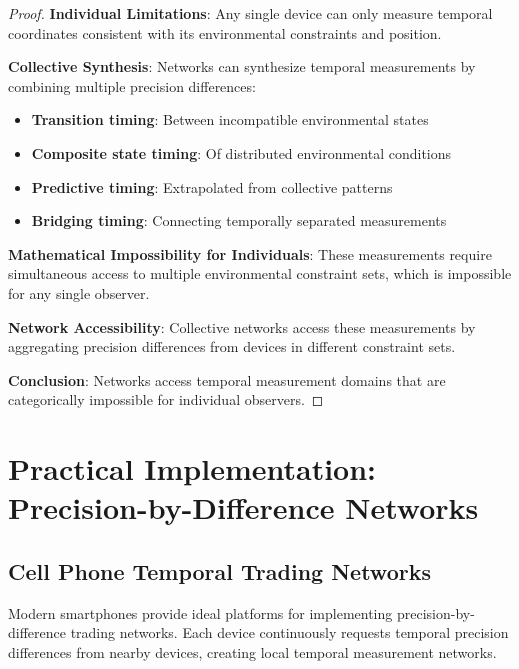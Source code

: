 \documentclass[12pt,a4paper]{article}
\begin{document}
\begin{proof}
\textbf{Individual Limitations}: Any single device can only measure temporal coordinates consistent with its environmental constraints and position.

\textbf{Collective Synthesis}: Networks can synthesize temporal measurements by combining multiple precision differences:
\begin{itemize}
\item \textbf{Transition timing}: Between incompatible environmental states
\item \textbf{Composite state timing}: Of distributed environmental conditions
\item \textbf{Predictive timing}: Extrapolated from collective patterns
\item \textbf{Bridging timing}: Connecting temporally separated measurements
\end{itemize}

\textbf{Mathematical Impossibility for Individuals}: These measurements require simultaneous access to multiple environmental constraint sets, which is impossible for any single observer.

\textbf{Network Accessibility}: Collective networks access these measurements by aggregating precision differences from devices in different constraint sets.

\textbf{Conclusion}: Networks access temporal measurement domains that are categorically impossible for individual observers.
\end{proof}

\section{Practical Implementation: Precision-by-Difference Networks}

\subsection{Cell Phone Temporal Trading Networks}

Modern smartphones provide ideal platforms for implementing precision-by-difference trading networks. Each device continuously requests temporal precision differences from nearby devices, creating local temporal measurement networks.
\end{document}
